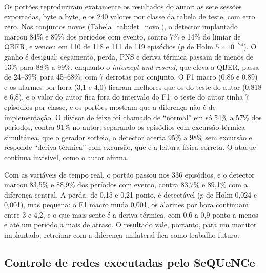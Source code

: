 \documentclass[12pt]{article}
\begin{document}
Os portões reproduziram exatamente os resultados do autor: as sete sessões
exportadas, byte a byte, e os 240 valores por classe da tabela de teste, com erro
zero. Nos conjuntos novos (Tabela~\ref{tab:det_novo}), o detector implantado
marcou 84\% e 89\% dos períodos com evento, contra 7\% e 14\% do limiar de
QBER, e venceu em 110 de 118 e 111 de 119 episódios ($p$ de Holm
$5\times10^{-24}$). O ganho é desigual: cegamento, perda, PNS e deriva térmica
passam de menos de 13\% para 88\% a 99\%, enquanto o \textit{intercept-and-resend},
que eleva a QBER, passa de 24--39\% para 45--68\%, com 7 derrotas por conjunto.
O F1 macro (0,86 e 0,89) e os alarmes por hora (3,1 e 4,0) ficaram melhores que os
do teste do autor (0,818 e 6,8), e o valor do autor fica fora do intervalo do F1:
o teste do autor tinha 7 episódios por classe, e os portões mostram que a
diferença não é de implementação. O divisor de feixe foi chamado de ``normal'' em
só 54\% a 57\% dos períodos, contra 91\% no autor; separando os episódios com
excursão térmica simultânea, que o gerador sorteia, o detector acerta 95\% a 98\%
sem excursão e responde ``deriva térmica'' com excursão, que é a leitura física
correta. O ataque continua invisível, como o autor afirma.

Com as variáveis de tempo real, o portão passou nos 336 episódios, e o detector
marcou 83,5\% e 88,9\% dos períodos com evento, contra 83,7\% e 89,1\% com a
diferença central. A perda, de 0,15 e 0,21 ponto, é detectável ($p$ de Holm 0,024 e
0,001), mas pequena: o F1 macro muda 0,001, os alarmes por hora continuam entre 3 e
4,2, e o que mais sente é a deriva térmica, com 0,6 a 0,9 ponto a menos e até um
período a mais de atraso. O resultado vale, portanto, para um monitor implantado;
retreinar com a diferença unilateral fica como trabalho futuro.

\subsection{Controle de redes executadas pelo SeQUeNCe}
\label{sec:sequence}
\end{document}
